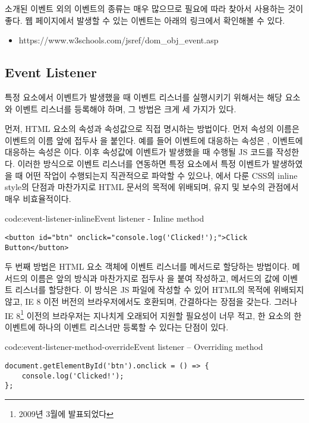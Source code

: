 소개된 이벤트 외의 이벤트의 종류는 매우 많으므로 필요에 따라 찾아서 사용하는 것이 좋다. 웹 페이지에서 발생할 수 있는 이벤트는 아래의 링크에서 확인해볼 수 있다.

\begin{itemize}
    \item https://www.w3schools.com/jsref/dom\_obj\_event.asp
\end{itemize}

\subsection*{Event Listener}

특정 요소에서 이벤트가 발생했을 때 이벤트 리스너를 실행시키기 위해서는 해당 요소와 이벤트 리스너를 등록해야 하며, 그 방법은 크게 세 가지가 있다.

먼저, HTML 요소의 속성과 속성값으로 직접 명시하는 방법이다. 먼저 속성의 이름은 이벤트의 이름 앞에 접두사 을 붙인다. 예를 들어  이벤트에 대응하는 속성은 ,  이벤트에 대응하는 속성은 이다. 이후 속성값에 이벤트가 발생했을 때 수행될 JS 코드를 작성한다. 이러한 방식으로 이벤트 리스너를 연동하면 특정 요소에서 특정 이벤트가 발생하였을 때 어떤 작업이 수행되는지 직관적으로 파악할 수 있으나, 에서 다룬 CSS의 inline style의 단점과 마찬가지로 HTML 문서의 목적에 위배되며, 유지 및 보수의 관점에서 매우 비효율적이다.

\begin{code}{code:event-listener-inline}{Event listener - Inline method}
\begin{verbatim}
<button id="btn" onclick="console.log('Clicked!');">Click Button</button>
\end{verbatim}
\end{code}

두 번째 방법은 HTML 요소 객체에 이벤트 리스너를 메서드로 할당하는 방법이다. 메서드의 이름은 앞의 방식과 마찬가지로 접두사 을 붙여 작성하고, 메서드의 값에 이벤트 리스너를 할당한다. 이 방식은 JS 파일에 작성할 수 있어 HTML의 목적에 위배되지 않고, IE 8 이전 버전의 브라우저에서도 호환되며, 간결하다는 장점을 갖는다. 그러나 IE 8\footnote{2009년 3월에 발표되었다} 이전의 브라우저는 지나치게 오래되어 지원할 필요성이 너무 적고, 한 요소의 한 이벤트에 하나의 이벤트 리스너만 등록할 수 있다는 단점이 있다.

\begin{code}{code:event-listener-method-override}{Event listener – Overriding method}
\begin{verbatim}
document.getElementById('btn').onclick = () => {
    console.log('Clicked!');
};
\end{verbatim}
\end{code}

